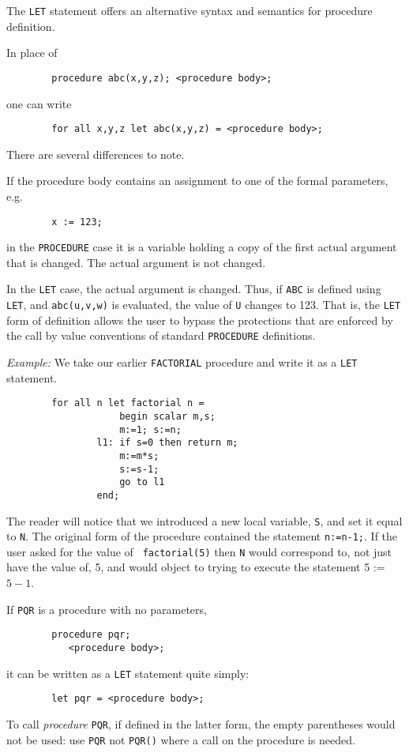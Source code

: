 The \texttt{LET} statement offers an alternative syntax and
semantics for procedure definition.

In place of
\begin{verbatim}
        procedure abc(x,y,z); <procedure body>;
\end{verbatim}
one can write
\begin{verbatim}
        for all x,y,z let abc(x,y,z) = <procedure body>;
\end{verbatim}
There are several differences to note.

If the procedure body contains an assignment to one of the formal
parameters, e.g.
\begin{verbatim}
        x := 123;
\end{verbatim}
in the \texttt{PROCEDURE} case it is a variable holding a copy of the first
actual argument that is changed.  The actual argument is not changed.

In the \texttt{LET} case, the actual argument is changed.  Thus, if \texttt{ABC}
is defined using \texttt{LET}, and \texttt{abc(u,v,w)} is evaluated, the value
of \texttt{U} changes to 123.  That is, the \texttt{LET} form of definition
allows the user to bypass the protections that are enforced by the call
by value conventions of standard \texttt{PROCEDURE} definitions.

\textit{Example:}  We take our earlier \texttt{FACTORIAL}
procedure and write it as a \texttt{LET} statement.
\begin{verbatim}
        for all n let factorial n =
                    begin scalar m,s;
                    m:=1; s:=n;
                l1: if s=0 then return m;
                    m:=m*s;
                    s:=s-1;
                    go to l1
                end;
\end{verbatim}
The reader will notice that we introduced a new local variable, \texttt{S},
and set it equal to \texttt{N}.  The original form of the procedure contained
the statement \texttt{n:=n-1;}.  If the user asked for the value of {\tt
factorial(5)} then \texttt{N} would correspond to, not just have the value
of, 5, and {\REDUCE} would object to trying to execute the statement
5 := $5-1$.

If \texttt{PQR} is a procedure with no parameters,
\begin{verbatim}
        procedure pqr;
           <procedure body>;
\end{verbatim}
it can be written as a \texttt{LET} statement quite simply:
\begin{verbatim}
        let pqr = <procedure body>;
\end{verbatim}
To call \emph{procedure} \texttt{PQR}, if defined in the latter form, the empty
parentheses would not be used: use \texttt{PQR} not \texttt{PQR()} where a call
on the procedure is needed.

